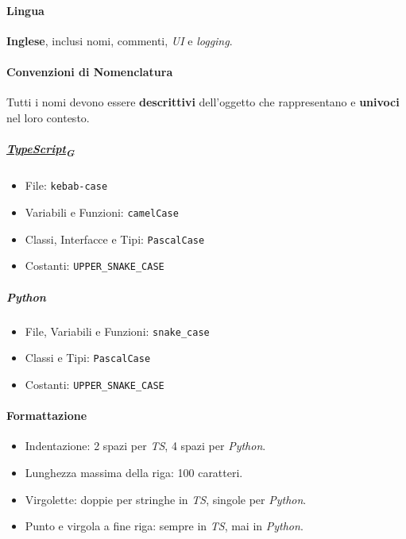 \documentclass[12pt, a4paper]{article}
\newcommand{\urlglossario}{https://skynetunigroup.github.io/Code_Guardian/Documentazione/PB/glossario_v2.0.0.pdf} %
\newcommand{\glo}[2]{\href{\urlglossario\#nameddest=#2}{#1\textsubscript{G}}}
\begin{document}

\paragraph{Lingua} \textbf{Inglese}, inclusi nomi, commenti, \textit{UI} e \textit{logging}.

\paragraph{Convenzioni di Nomenclatura} Tutti i nomi devono essere \textbf{descrittivi} dell'oggetto che rappresentano e \textbf{univoci} nel loro contesto.

\subparagraph{\textit{\glo{TypeScript}{typescript}}}
\begin{itemize}
    \item File: \texttt{kebab-case}
    \item Variabili e Funzioni: \texttt{camelCase}
    \item Classi, Interfacce e Tipi: \texttt{PascalCase}
    \item Costanti: \texttt{UPPER\_SNAKE\_CASE}
\end{itemize}

\subparagraph{\textit{Python}}
\begin{itemize}
    \item File, Variabili e Funzioni: \texttt{snake\_case}
    \item Classi e Tipi: \texttt{PascalCase}
    \item Costanti: \texttt{UPPER\_SNAKE\_CASE}
\end{itemize}

\paragraph{Formattazione}
\begin{itemize}
    \item Indentazione: 2 spazi per \textit{TS}, 4 spazi per \textit{Python}.
    \item Lunghezza massima della riga: 100 caratteri.
    \item Virgolette: doppie per stringhe in \textit{TS}, singole per \textit{Python}.
    \item Punto e virgola a fine riga: sempre in \textit{TS}, mai in \textit{Python}.
\end{itemize}
\end{document}
